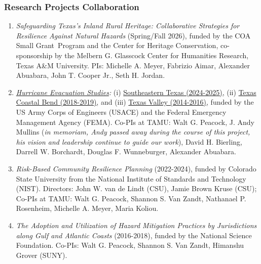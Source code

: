 \documentclass[11pt,oneside]{article}
\begin{document}
\subsubsection{Research Projects Collaboration}
\begin{enumerate}[leftmargin=40pt]
\item {\emph{Safeguarding Texas's Inland Rural Heritage: Collaborative Strategies for Resilience Against Natural Hazards}} (Spring/Fall 2026), funded by the COA Small Grant Program and the Center for Heritage Conservation, co-sponsorship by the Melbern G. Glasscock Center for Humanities Research, Texas A\&M University. PIs: Michelle A. Meyer, Fabrizio Aimar, Alexander Abuabara, John T. Cooper Jr., Seth H. Jordan.
\item \emph{\href{https://texas-planning-atlas-tamu.hub.arcgis.com}{Hurricane Evacuation Studies}:} 
(i) \href{https://texasatlas.arch.tamu.edu}{{Southeastern Texas (2024-2025)}}, 
(ii) \href{https://texas-planning-atlas-tamu.hub.arcgis.com/apps/337900395c604c3cb2cc1feeb41a9053/explore}{Texas Coastal Bend (2018-2019)}, and 
(iii) \href{https://texas-planning-atlas-tamu.hub.arcgis.com/apps/047af4b2415b442e9bb10108ab1d3eb4/explore}{Texas Valley (2014-2016)}, funded by the {US Army Corps of Engineers (USACE)} and the {Federal Emergency Management Agency (FEMA)}.  Co-PIs at TAMU: Walt G. Peacock, J. Andy Mullins (\emph{in memoriam, Andy passed away during the course of this project, his vision and leadership continue to guide our work}), David H. Bierling, Darrell W. Borchardt, Douglas F. Wunneburger, Alexander Abuabara.
\item \emph{Risk-Based Community Resilience Planning} (2022-2024), funded by Colorado State University from the National Institute of Standards and Technology (NIST). Directors: John W. van de Lindt (CSU), Jamie Brown Kruse (CSU); Co-PIs at TAMU: Walt G. Peacock, Shannon S. Van Zandt, Nathanael P. Rosenheim, Michelle A. Meyer, Maria Koliou.
\item \emph{The Adoption and Utilization of Hazard Mitigation Practices by Jurisdictions along Gulf and Atlantic Coasts} (2016-2018), funded by the National Science Foundation. Co-PIs: Walt G. Peacock, Shannon S. Van Zandt, Himanshu Grover (SUNY).
\end{enumerate}
\end{document}
